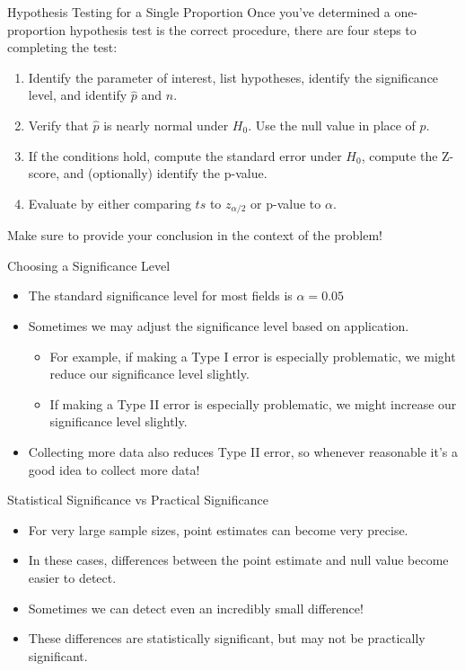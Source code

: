 \begin{frame}{Hypothesis Testing for a Single Proportion}
    Once you've determined a one-proportion hypothesis test is the correct procedure, there are four steps to completing the test:
    \begin{enumerate}
        \item Identify the parameter of interest, list hypotheses, identify the significance level, and identify $\hat{p}$ and $n$.
        \item Verify that $\hat{p}$ is nearly normal under $H_0$. Use the null value in place of $p$.
        \item If the conditions hold, compute the standard error under $H_0$, compute the Z-score, and (optionally) identify the p-value.
        \item Evaluate by either comparing $ts$ to $z_{\alpha/2}$ or p-value to $\alpha$. 
    \end{enumerate}
    Make sure to provide your conclusion in the context of the problem!
\end{frame}

\begin{frame}{Choosing a Significance Level}
    \begin{itemize}
        \item The standard significance level for most fields is $\alpha=0.05$
        \item Sometimes we may adjust the significance level based on application.
        \begin{itemize}
            \item For example, if making a Type I error is especially problematic, we might reduce our significance level slightly.
            \item If making a Type II error is especially problematic, we might increase our significance level slightly.
        \end{itemize}
        \item Collecting more data also reduces Type II error, so whenever reasonable it's a good idea to collect more data!
    \end{itemize}
\end{frame}

\begin{frame}{Statistical Significance vs Practical Significance}
    \begin{itemize}
        \item For very large sample sizes, point estimates can become very precise.
        \item In these cases, differences between the point estimate and null value become easier to detect.
        \item Sometimes we can detect even an incredibly small difference!
        \item These differences are statistically significant, but may not be practically significant.
    \end{itemize}
\end{frame}

